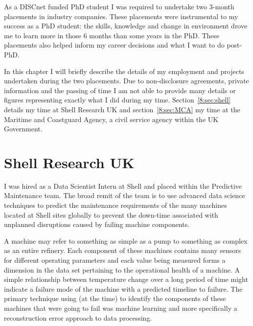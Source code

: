 As a DISCnet funded PhD student I was required to undertake two 3-month placements in industry companies. These placements were instrumental to my success as a PhD student: the skills, knowledge and change in environment drove me to learn more in those $6$ months than some years in the PhD. These placements also helped inform my career decisions and what I want to do post-PhD.

In this chapter I will briefly describe the details of my employment and projects undertaken during the two placements. Due to non-disclosure agreements, private information and the passing of time I am not able to provide many details or figures representing exactly what I did during my time. Section~\ref{8:sec:shell} details my time at Shell Research UK and section~\ref{8:sec:MCA} my time at the Maritime and Coastguard Agency, a civil service agency within the UK Government.

\section{\label{8:sec:shell}Shell Research UK}

I was hired as a Data Scientist Intern at Shell and placed within the Predictive Maintenance team. The broad remit of the team is to use advanced data science techniques to predict the maintenance requirements of the many machines located at Shell sites globally to prevent the down-time associated with unplanned disruptions caused by failing machine components.

A machine may refer to something as simple as a pump to something as complex as an entire refinery. Each component of these machines contains many sensors for different operating parameters and each value being measured forms a dimension in the data set pertaining to the operational health of a machine. A simple relationship between temperature change over a long period of time might indicate a failure mode of the machine with a predicted timeline to failure. The primary technique using (at the time) to identify the components of these machines that were going to fail was machine learning and more specifically a reconstruction error approach to data processing.




